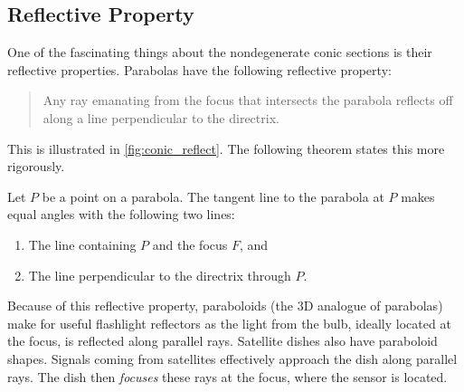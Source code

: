 {\subsection{Reflective Property}

One of the fascinating things about the nondegenerate conic sections is their reflective properties. Parabolas have the following reflective property:

\begin{quote}
	Any ray emanating from the focus that intersects the parabola reflects off along a line perpendicular to the directrix.
\end{quote}

This is illustrated in \autoref{fig:conic_reflect}. The following theorem states this more rigorously.

	
\begin{theorem}\label{thm:parabola_reflect}%
Let $P$ be a point on a parabola. The tangent line to the parabola at $P$ makes equal angles with the following two lines:
\begin{enumerate}
	\item	The line containing $P$ and the focus $F$, and
	\item	The line perpendicular to the directrix through $P$.
\end{enumerate}
\end{theorem}


Because of this reflective property, paraboloids (the 3D analogue of parabolas) make for useful flashlight reflectors as the light from the bulb, ideally located at the focus, is reflected along parallel rays. Satellite dishes also have paraboloid shapes. Signals coming from satellites effectively approach the dish along parallel rays. The dish then \emph{focuses} these rays at the focus, where the sensor is located.
}

